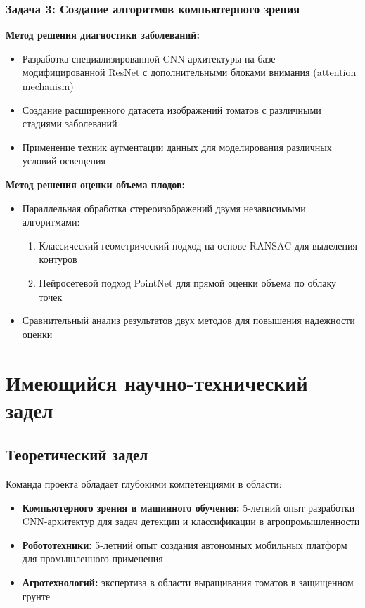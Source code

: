 \documentclass[12pt,a4paper]{article}
\begin{document}
\subsubsection{Задача 3: Создание алгоритмов компьютерного зрения}
\textbf{Метод решения диагностики заболеваний:}
\begin{itemize}
    \item Разработка специализированной CNN-архитектуры на базе модифицированной ResNet с дополнительными блоками внимания (attention mechanism)
    \item Создание расширенного датасета изображений томатов с различными стадиями заболеваний
    \item Применение техник аугментации данных для моделирования различных условий освещения
\end{itemize}

\textbf{Метод решения оценки объема плодов:}
\begin{itemize}
    \item Параллельная обработка стереоизображений двумя независимыми алгоритмами:
    \begin{enumerate}
        \item Классический геометрический подход на основе RANSAC для выделения контуров
        \item Нейросетевой подход PointNet для прямой оценки объема по облаку точек
    \end{enumerate}
    \item Сравнительный анализ результатов двух методов для повышения надежности оценки
\end{itemize}

\section{Имеющийся научно-технический задел}

\subsection{Теоретический задел}
Команда проекта обладает глубокими компетенциями в области:
\begin{itemize}
    \item \textbf{Компьютерного зрения и машинного обучения:} 5-летний опыт разработки CNN-архитектур для задач детекции и классификации в агропромышленности
    \item \textbf{Робототехники:} 5-летний опыт создания автономных мобильных платформ для промышленного применения
    \item \textbf{Агротехнологий:} экспертиза в области выращивания томатов в защищенном грунте
\end{itemize}
\end{document}
